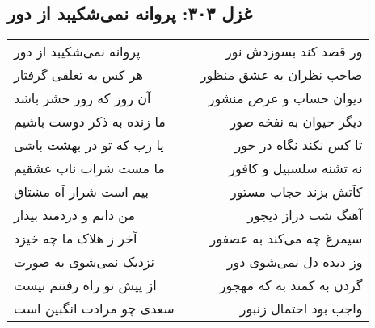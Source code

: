 \begin{center}
\section*{غزل ۳۰۳: پروانه نمی‌شکیبد از دور}
\label{sec:303}
\begin{longtable}{l p{0.5cm} r}
پروانه نمی‌شکیبد از دور
&&
ور قصد کند بسوزدش نور
\\
هر کس به تعلقی گرفتار
&&
صاحب نظران به عشق منظور
\\
آن روز که روز حشر باشد
&&
دیوان حساب و عرض منشور
\\
ما زنده به ذکر دوست باشیم
&&
دیگر حیوان به نفخه صور
\\
یا رب که تو در بهشت باشی
&&
تا کس نکند نگاه در حور
\\
ما مست شراب ناب عشقیم
&&
نه تشنه سلسبیل و کافور
\\
بیم است شرار آه مشتاق
&&
کآتش بزند حجاب مستور
\\
من دانم و دردمند بیدار
&&
آهنگ شب دراز دیجور
\\
آخر ز هلاک ما چه خیزد
&&
سیمرغ چه می‌کند به عصفور
\\
نزدیک نمی‌شوی به صورت
&&
وز دیده دل نمی‌شوی دور
\\
از پیش تو راه رفتنم نیست
&&
گردن به کمند به که مهجور
\\
سعدی چو مرادت انگبین است
&&
واجب بود احتمال زنبور
\\
\end{longtable}
\end{center}
